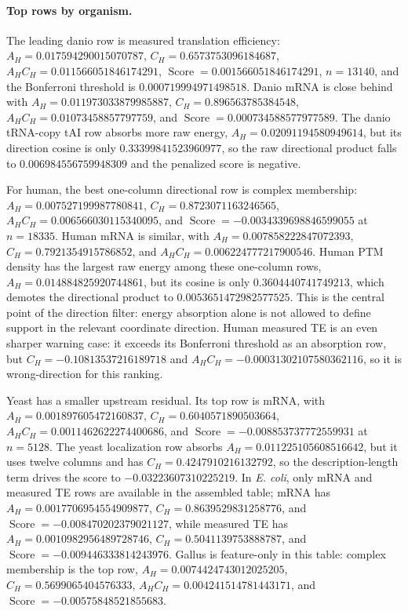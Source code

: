 \paragraph{Top rows by organism.}
The leading danio row is measured translation efficiency: $A_H=0.017594290015070787$, $C_H=0.6573753096184687$, $A_H C_H=0.011566051846174291$, $\operatorname{Score}=0.001566051846174291$, $n=13140$, and the Bonferroni threshold is $0.000719994971498518$.  Danio mRNA is close behind with $A_H=0.011973033879985887$, $C_H=0.896563785384548$, $A_HC_H=0.01073458857797759$, and $\operatorname{Score}=0.000734588577977589$.  The danio tRNA-copy tAI row absorbs more raw energy, $A_H=0.02091194580949614$, but its direction cosine is only $0.33399841523960977$, so the raw directional product falls to $0.006984556759948309$ and the penalized score is negative.

For human, the best one-column directional row is complex membership: $A_H=0.007527199987780841$, $C_H=0.8723071163246565$, $A_HC_H=0.006566030115340095$, and $\operatorname{Score}=-0.0034339698846599055$ at $n=18335$.  Human mRNA is similar, with $A_H=0.007858222847072393$, $C_H=0.7921354915786852$, and $A_HC_H=0.006224777217900546$.  Human PTM density has the largest raw energy among these one-column rows, $A_H=0.014884825920744861$, but its cosine is only $0.3604440741749213$, which demotes the directional product to $0.0053651472982577525$.  This is the central point of the direction filter: energy absorption alone is not allowed to define support in the relevant coordinate direction.  Human measured TE is an even sharper warning case: it exceeds its Bonferroni threshold as an absorption row, but $C_H=-0.10813537216189718$ and $A_HC_H=-0.00031302107580362116$, so it is wrong-direction for this ranking.

Yeast has a smaller upstream residual.  Its top row is mRNA, with $A_H=0.001897605472160837$, $C_H=0.6040571890503664$, $A_HC_H=0.0011462622274400686$, and $\operatorname{Score}=-0.008853737772559931$ at $n=5128$.  The yeast localization row absorbs $A_H=0.011225105608516642$, but it uses twelve columns and has $C_H=0.4247910216132792$, so the description-length term drives the score to $-0.03223607310225219$.  In \emph{E. coli}, only mRNA and measured TE rows are available in the assembled table; mRNA has $A_H=0.0017706954554909877$, $C_H=0.8639529831258776$, and $\operatorname{Score}=-0.008470202379021127$, while measured TE has $A_H=0.0010982956489728746$, $C_H=0.5041139753888787$, and $\operatorname{Score}=-0.009446333814243976$.  Gallus is feature-only in this table: complex membership is the top row, $A_H=0.0074424743012025205$, $C_H=0.5699065404576333$, $A_HC_H=0.004241514781443171$, and $\operatorname{Score}=-0.00575848521855683$.

